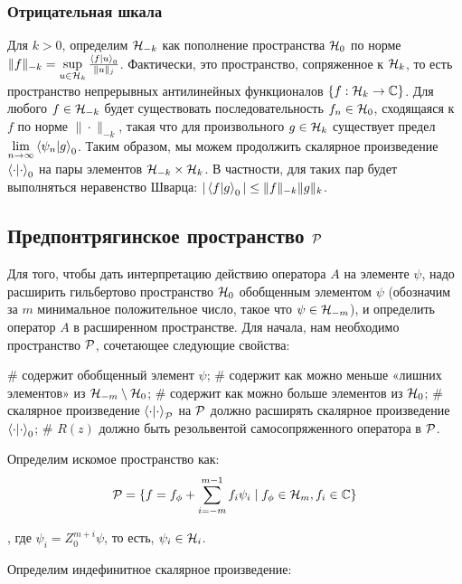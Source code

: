 \subsubsection{Отрицательная шкала}
Для $k > 0$, определим $\mathcal{H}_{-k}$ как пополнение пространства $\mathcal{H}_{0}$ по норме $\|f \|_{-k} = \sup\limits_{u \in \hilb{k}} \frac{\ip{f}{u}_0}{\|u\|_j}$. Фактически, это пространство, сопряженное к $\mathcal{H}_{k}$, то есть пространство непрерывных антилинейных функционалов $\{ f: \mathcal{H}_{k} \to \mathbb{C} \}$. Для любого $f \in \mathcal{H}_{-k}$ будет существовать последовательность $f_n \in \mathcal{H}_{0}$, сходящаяся к $f$ по норме $\|\cdot\|_{-k}$, такая что для произвольного $g \in \mathcal{H}_{k}$ существует предел $\lim\limits_{n \to \infty} \ip{\psi_n}{g}_0$. Таким образом, мы можем продолжить скалярное произведение $\ipcdot_0$ на пары элементов $\mathcal{H}_{-k} \times \mathcal{H}_{k}$. В частности, для таких пар будет выполняться неравенство Шварца: $|\ip{f}{g}_0| \le \|f\|_{-k} \|g\|_k$.

\subsection{Предпонтрягинское пространство $\mathcal{P}$}
Для того, чтобы дать интерпретацию действию оператора $A$ на элементе $\psi$, надо расширить гильбертово пространство $\mathcal{H}_{0}$ обобщенным элементом $\psi$ (обозначим за $m$ минимальное положительное число, такое что $\psi \in \mathcal{H}_{-m}$), и определить оператор $A$ в расширенном пространстве. Для начала, нам необходимо пространство $\mathcal{P}$, сочетающее следующие свойства:

\begin{elist}
# содержит обобщенный элемент $\psi$;
# содержит как можно меньше «лишних элементов» из  $\mathcal{H}_{-m} \setminus \mathcal{H}_{0}$;
# содержит как можно больше элементов из $\mathcal{H}_{0}$;
# скалярное произведение $\ipcdot_\mcP$ на $\mathcal{P}$ должно расширять скалярное произведение $\ipcdot_0$;
# $R(z)$ должно быть резольвентой самосопряженного оператора в $\mathcal{P}$.
\end{elist}

Определим искомое пространство как:
\[
\mathcal{P} = 
\{ f = f_\phi + \sum\limits_{i = -m}^{m - 1} f_i \psi_i \mid f_\phi \in \mathcal{H}_{m}, f_i \in \mathbb{C}\}
\]

, где $\psi_i = Z_0^{m + i} \psi$, то есть, $\psi_i \in \mathcal{H}_{i}$.

Определим индефинитное скалярное произведение:

